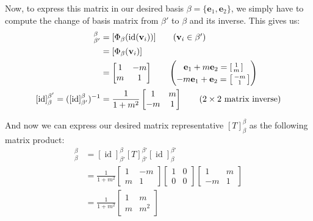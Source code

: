 \documentclass{article}
\renewcommand\vec{\mathbf}
\newcommand{\icol}[1]{%
  \begin{bsmallmatrix}#1\end{bsmallmatrix}%
}
\begin{document}
Now, to express this matrix in our desired basis $\beta=\{\vec e_1,\vec e_2\}$, we simply have to compute the change of basis matrix from $\beta'$ to $\beta$ and its inverse. This gives us:
\begin{align*}
  [\operatorname{id}]_{\beta'}^{\beta}&=[\Phi_{\beta}(\operatorname{id}(\vec v_i))]\tag{$\vec v_i\in\beta'$}\\
  &=[\Phi_{\beta}(\vec v_i)]\\
  &=\begin{bmatrix}
    1&-m\\m&1
  \end{bmatrix}\tag*{$\left(\stackanchor{$\vec e_1+m\vec e_2=\icol{1\\m}$}{$-m\vec e_1+\vec e_2=\icol{-m\\1}$}\right)$}\\
  [\operatorname{id}]^{\beta'}_{\beta}=([\operatorname{id}]_{\beta'}^{\beta})^{-1}&=\frac{1}{1+m^2}\begin{bmatrix}
    1&m\\-m&1
  \end{bmatrix}\tag{$2\times 2$ matrix inverse}
\end{align*}

And now we can express our desired matrix representative $[T]_{\beta}^{\beta}$ as the following matrix product:
\begin{align*}
  [T]_{\beta}^{\beta}&=[\operatorname{id}]_{\beta'}^{\beta}[T]_{\beta'}^{\beta'}[\operatorname{id}]^{\beta'}_{\beta}\\
  &=\frac{1}{1+m^2}\begin{bmatrix}
    1&-m\\m&1
  \end{bmatrix}\begin{bmatrix}
    1&0\\0&0
  \end{bmatrix}\begin{bmatrix}
    1&m\\-m&1
  \end{bmatrix}\\
  &=\frac{1}{1+m^2}\begin{bmatrix}
      1&m\\m&m^2
    \end{bmatrix}
\end{align*}
\end{document}

